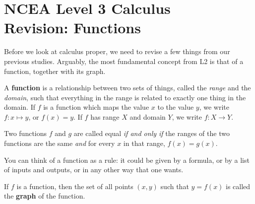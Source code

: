 


\section*{NCEA Level 3 Calculus\\Revision: Functions}
Before we look at calculus proper, we need to revise a few things from our previous studies. Arguably, the most fundamental
concept from L2 is that of a function, together with its graph.

\begin{defn}[Function]
  A \textbf{function} is a relationship between two sets of things, called the \textit{range} and the \textit{domain}, such that
  everything in the range is related to exactly one thing in the domain. If $ f $ is a function which maps the value $ x $
  to the value $ y $, we write $ f : x \mapsto y $, or $ f(x) = y $. If $ f $ has range $ X $ and domain $ Y $, we write $ f : X \to Y $.

  Two functions $ f $ and $ g $ are called equal \emph{if and only if} the ranges of the two functions are the same \emph{and} for every $ x $ in that
  range, $ f(x) = g(x) $.
\end{defn}
You can think of a function as a rule: it could be given by a formula, or by a list of inputs and outputs, or in any other way that one wants.

\begin{defn}[Graph]
  If $ f $ is a function, then the set of all points $ (x,y) $ such that $ y = f(x) $ is called the \textbf{graph} of the function.
\end{defn}

